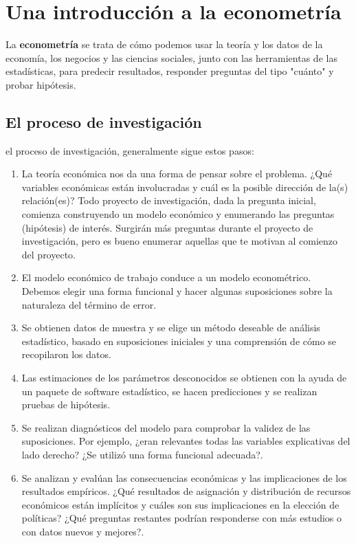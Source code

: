 \chapter{Una introducción a la econometría}

\begin{tcolorbox}[colback=white]
    La \textbf{econometría} se trata de cómo podemos usar la teoría y los datos de la economía, los negocios y las ciencias sociales, junto con las herramientas de las estadísticas, para predecir resultados, responder preguntas del tipo "cuánto" y probar hipótesis.
\end{tcolorbox}

\section{El proceso de investigación}
el proceso de investigación,  generalmente sigue estos pasos:
\begin{enumerate}[\bfseries 1.]
    \item La teoría económica nos da una forma de pensar sobre el problema. ¿Qué variables económicas están involucradas y cuál es la posible dirección de la(s) relación(es)? Todo proyecto de investigación, dada la pregunta inicial, comienza construyendo un modelo económico y enumerando las preguntas (hipótesis) de interés. Surgirán más preguntas durante el proyecto de investigación, pero es bueno enumerar aquellas que te motivan al comienzo del proyecto.
    \item El modelo económico de trabajo conduce a un modelo econométrico. Debemos elegir una forma funcional y hacer algunas suposiciones sobre la naturaleza del término de error.
    \item Se obtienen datos de muestra y se elige un método deseable de análisis estadístico, basado en suposiciones iniciales y una comprensión de cómo se recopilaron los datos.
    \item Las estimaciones de los parámetros desconocidos se obtienen con la ayuda de un paquete de software estadístico, se hacen predicciones y se realizan pruebas de hipótesis.
    \item Se realizan diagnósticos del modelo para comprobar la validez de las suposiciones. Por ejemplo, ¿eran relevantes todas las variables explicativas del lado derecho? ¿Se utilizó una forma funcional adecuada?.
    \item Se analizan y evalúan las consecuencias económicas y las implicaciones de los resultados empíricos. ¿Qué resultados de asignación y distribución de recursos económicos están implícitos y cuáles son sus implicaciones en la elección de políticas? ¿Qué preguntas restantes podrían responderse con más estudios o con datos nuevos y mejores?.
\end{enumerate}

